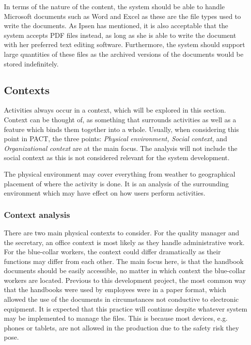 In terms of the nature of the content, the system should be able to handle Microsoft documents such as Word and Excel as these are the file types used to write the documents.
As Ipsen has mentioned, it is also acceptable that the system accepts PDF files instead, as long as she is able to write the document with her preferred text editing software.
Furthermore, the system should support large quantities of these files as the archived versions of the documents would be stored indefinitely.

\subsection{Contexts}\label{sec:pactcontext}
Activities always occur in a context, which will be explored in this section.
Context can be thought of, as something that surrounds activities as well as a feature which binds them together into a whole.
Usually, when considering this point in PACT, the three points: \textit{Physical environment, Social context}, and \textit{Organizational context} are at the main focus.
The analysis will not include the social context as this is not considered relevant for the system development.

The physical environment may cover everything from weather to geographical placement of where the activity is done.
It is an analysis of the surrounding environment which may have effect on how users perform activities.

\subsubsection*{Context analysis}
There are two main physical contexts to consider.
For the quality manager and the secretary, an office context is most likely as they handle administrative work.
For the blue-collar workers, the context could differ dramatically as their functions may differ from each other.
The main focus here, is that the handbook documents should be easily accessible, no matter in which context the blue-collar workers are located.
Previous to this development project, the most common way that the handbooks were used by employees were in a paper format, which allowed the use of the documents in circumstances not conductive to electronic equipment.
It is expected that this practice will continue despite whatever system may be implemented to manage the files.
This is because most devices, e.g. phones or tablets, are not allowed in the production due to the safety risk they pose.

